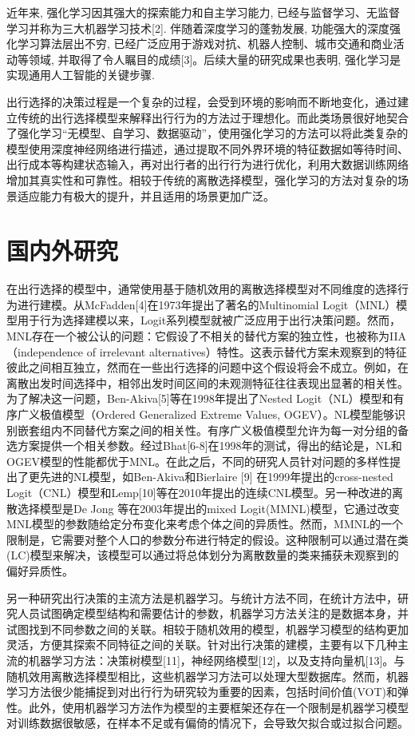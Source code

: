 近年来, 强化学习因其强大的探索能力和自主学习能力, 已经与监督学习、无监督学习并称为三大机器学习技术[2]. 伴随着深度学习的蓬勃发展, 功能强大的深度强化学习算法层出不穷, 已经广泛应用于游戏对抗、机器人控制、城市交通和商业活动等领域, 并取得了令人瞩目的成绩[3]。后续大量的研究成果也表明, 强化学习是实现通用人工智能的关键步骤.

出行选择的决策过程是一个复杂的过程，会受到环境的影响而不断地变化，通过建立传统的出行选择模型来解释出行行为的方法过于理想化。而此类场景很好地契合了强化学习“无模型、自学习、数据驱动”，使用强化学习的方法可以将此类复杂的模型使用深度神经网络进行描述，通过提取不同外界环境的特征数据如等待时间、出行成本等构建状态输入，再对出行者的出行行为进行优化，利用大数据训练网络增加其真实性和可靠性。相较于传统的离散选择模型，强化学习的方法对复杂的场景适应能力有极大的提升，并且适用的场景更加广泛。


\section{国内外研究}


在出行选择的模型中，通常使用基于随机效用的离散选择模型对不同维度的选择行为进行建模。从McFadden[4]在1973年提出了著名的Multinomial Logit（MNL）模型用于行为选择建模以来，Logit系列模型就被广泛应用于出行决策问题。然而，MNL存在一个被公认的问题：它假设了不相关的替代方案的独立性，也被称为IIA（independence of irrelevant alternatives）特性。这表示替代方案未观察到的特征彼此之间相互独立，然而在一些出行选择的问题中这个假设将会不成立。例如，在离散出发时间选择中，相邻出发时间区间的未观测特征往往表现出显著的相关性。为了解决这一问题，Ben-Akiva[5]等在1998年提出了Nested Logit（NL）模型和有序广义极值模型（Ordered Generalized Extreme Values, OGEV）。NL模型能够识别嵌套组内不同替代方案之间的相关性。有序广义极值模型允许为每一对分组的备选方案提供一个相关参数。经过Bhat[6-8]在1998年的测试，得出的结论是，NL和OGEV模型的性能都优于MNL。在此之后，不同的研究人员针对问题的多样性提出了更先进的NL模型，如Ben-Akiva和Bierlaire [9] 在1999年提出的cross-nested Logit（CNL）模型和Lemp[10]等在2010年提出的连续CNL模型。另一种改进的离散选择模型是De Jong 等在2003年提出的mixed Logit(MMNL)模型，它通过改变MNL模型的参数随给定分布变化来考虑个体之间的异质性。然而，MMNL的一个限制是，它需要对整个人口的参数分布进行特定的假设。这种限制可以通过潜在类(LC)模型来解决，该模型可以通过将总体划分为离散数量的类来捕获未观察到的偏好异质性。

另一种研究出行决策的主流方法是机器学习。与统计方法不同，在统计方法中，研究人员试图确定模型结构和需要估计的参数，机器学习方法关注的是数据本身，并试图找到不同参数之间的关联。相较于随机效用的模型，机器学习模型的结构更加灵活，方便其探索不同特征之间的关联。针对出行决策的建模，主要有以下几种主流的机器学习方法：决策树模型[11]，神经网络模型[12]，以及支持向量机[13]。与随机效用离散选择模型相比，这些机器学习方法可以处理大型数据库。然而，机器学习方法很少能捕捉到对出行行为研究较为重要的因素，包括时间价值(VOT)和弹性。此外，使用机器学习方法作为模型的主要框架还存在一个限制是机器学习模型对训练数据很敏感，在样本不足或有偏倚的情况下，会导致欠拟合或过拟合问题。

